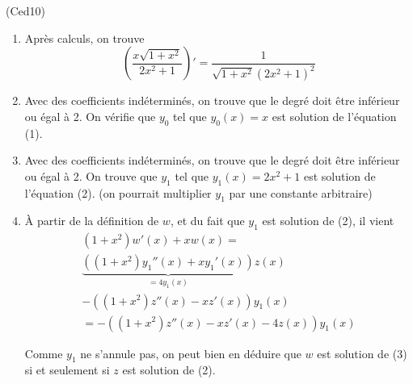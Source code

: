 \begin{tiny}(Ced10)\end{tiny}
\begin{enumerate}
 \item Après calculs, on trouve
\begin{displaymath}
  \left( \frac{x\sqrt{1+x^2}}{2x^2+1}\right)' =
\frac{1}{\sqrt{1+x^2}(2x^2+1)^2} 
\end{displaymath}

 \item Avec des coefficients indéterminés, on trouve que le degré doit être inférieur ou égal à 2. On vérifie que $y_0$ tel que $y_0(x)=x$  est solution de l'équation (1).

 \item Avec des coefficients indéterminés, on trouve que le degré doit être inférieur ou égal à 2. On trouve que $y_1$ tel que $y_1(x)=2x^2 + 1$  est solution de l'équation (2). (on pourrait multiplier $y_1$ par une constante arbitraire)

 \item À partir de la définition de $w$, et du fait que $y_1$ est solution de (2), il vient
\begin{multline*}
 (1+x^2)w'(x) + xw(x) = \\
 \underset{=4y_1(x)}{\underbrace{\left((1+x^2)y_1''(x) +x y_1'(x) \right)}}z(x) \\
 - \left( (1+x^2)z''(x)-xz'(x)\right)y_1(x) \\
= -\left((1+x^2)z''(x)-xz'(x)-4z(x) \right)y_1(x)   
\end{multline*}

Comme $y_1$ ne s'annule pas, on peut bien en déduire que $w$ est solution de (3) si et seulement si $z$ est solution de (2).


\end{enumerate}
